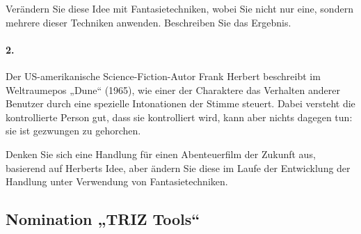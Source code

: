 \documentclass[11pt,a4paper]{article}
\begin{document}
Verändern Sie diese Idee mit Fantasietechniken, wobei Sie nicht nur eine,
sondern mehrere dieser Techniken anwenden. Beschreiben Sie das Ergebnis.

\paragraph{2.}
Der US-amerikanische Science-Fiction-Autor Frank Herbert beschreibt im
Weltraumepos „Dune“ (1965), wie einer der Charaktere das Verhalten anderer
Benutzer durch eine spezielle Intonationen der Stimme steuert. Dabei versteht
die kontrollierte Person gut, dass sie kontrolliert wird, kann aber nichts
dagegen tun: sie ist gezwungen zu gehorchen.

Denken Sie sich eine Handlung für einen Abenteuerfilm der Zukunft aus,
basierend auf Herberts Idee, aber ändern Sie diese im Laufe der Entwicklung
der Handlung unter Verwendung von Fantasietechniken.

\subsection*{Nomination „TRIZ Tools“}
\end{document}
